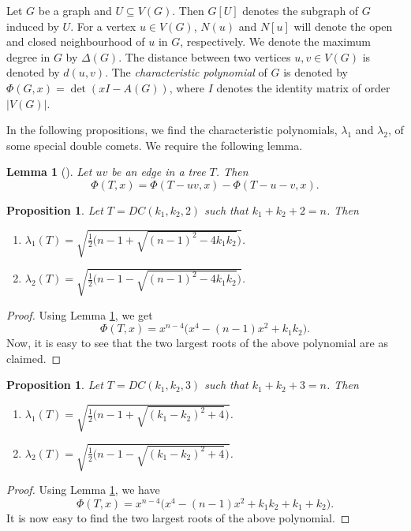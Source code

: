 \documentclass[11pt]{article}
\theoremstyle{plain}
\newtheorem{lemma}[theorem]{Lemma}
\newtheorem{proposition}[theorem]{Proposition}
\numberwithin{equation}{section}
\begin{document}
Let $G$ be a graph and $U\subseteq V(G)$. Then $G[U]$ denotes the subgraph of $G$ induced by $U$. For a vertex $u\in V(G)$, $N(u)$ and $N[u]$ will denote the open and closed neighbourhood of $u$ in $G$, respectively. We denote the maximum degree in $G$ by $\Delta(G)$. The distance between two vertices $u, v\in V(G)$ is denoted by $d(u, v)$. The \emph{characteristic polynomial} of $G$ is denoted by $\Phi(G,x) = \det(xI -A(G))$, where $I$ denotes the identity matrix of order $|V(G)|$.

In the following propositions, we find the characteristic polynomials, $\lambda_1$ and $\lambda_2$, of some special double comets. We require the following lemma.

\begin{lemma}[\cite{CRS_2010}]
\label{lemma:char_edge}
    Let $uv$ be an edge in a tree $T$. Then 
    \[\Phi(T,x)=\Phi(T-uv, x)-\Phi(T-u-v,x).\]
\end{lemma}

\begin{proposition}\label{prop:DC_path_2}
Let $T=DC(k_1, k_2,2)$ such that $k_1+k_2+2=n$. Then
\begin{enumerate}[$(i)$]
    \item $\lambda_1(T)=\sqrt{\frac{1}{2}\big(n-1+\sqrt{(n-1)^2 - 4k_1k_2} \big)}$.
    \item $\lambda_2(T)=\sqrt{\frac{1}{2}\big(n-1-\sqrt{(n-1)^2 - 4k_1k_2} \big)}$.
\end{enumerate}
\end{proposition}
\begin{proof}
  Using Lemma \ref{lemma:char_edge}, we get
  \[ \Phi(T,x)=x^{n-4}\big(x^4 - (n-1)x^2 + k_1k_2\big).\] Now, it is easy to see that the two largest roots of the above polynomial are as claimed.
\end{proof}

\begin{proposition}\label{prop:DC_path_3}
Let $T=DC(k_1,k_2,3)$ such that $k_1+k_2+3=n$. Then 
\begin{enumerate}[$(i)$]
    \item $\lambda_1(T)=\sqrt{\frac{1}{2}\big(n-1 + \sqrt{(k_1-k_2)^2+4}\big)}$.
    \item $\lambda_2(T)=\sqrt{\frac{1}{2}\big(n-1 - \sqrt{(k_1-k_2)^2+4}\big)}$.
\end{enumerate}
\end{proposition}
\begin{proof}
Using Lemma \ref{lemma:char_edge}, we have 
\[\Phi(T,x) = x^{n-4}\big(x^4-(n-1)x^2 + k_1k_2+k_1+k_2\big). \]
It is now easy to find the two largest roots of the above polynomial.
\end{proof}
\end{document}
